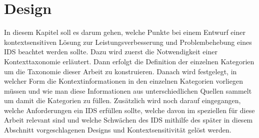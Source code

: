 \chapter{Design}%
\label{cha:design}

In diesem Kapitel soll es darum gehen, welche Punkte bei einem Entwurf einer kontextsensitiven Lösung zur Leistungsverbesserung und Problembehebung eines IDS beachtet werden sollte. Dazu wird zuerst die Notwendigkeit einer Kontexttaxonomie erläutert. Dann erfolgt die Definition der einzelnen Kategorien um die Taxonomie dieser Arbeit zu konstruieren. Danach wird festgelegt, in welcher Form die Kontextinformationen in den einzelnen Kategorien vorliegen müssen und wie man diese Informationen aus unterschiedlichen Quellen sammelt um damit die Kategorien zu füllen. Zusätzlich wird noch darauf eingegangen, welche Anforderungen ein IDS erfüllen sollte, welche davon im speziellen für diese Arbeit relevant sind und welche Schwächen des IDS mithilfe des später in diesem Abschnitt vorgeschlagenen Designs und Kontextsensitivität gelöst werden.

